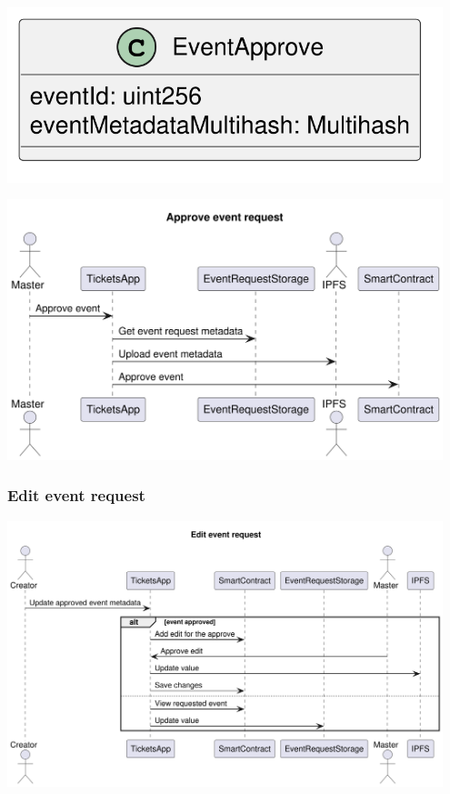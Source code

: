 \documentclass[11pt]{article}
\begin{document}
\begin{center}
\includegraphics[width=0.95\textwidth]{./img/event-approve.png}
\label{org6d06529}
\end{center}

\begin{center}
\includegraphics[width=0.95\textwidth]{./img/approve-event-request.png}
\label{org67cfabb}
\end{center}
\subsubsection{Edit event request}
\label{sec:orgd42e58c}

\begin{center}
\includegraphics[width=0.95\textwidth]{./img/edit-event-request.png}
\label{org3f988f8}
\end{center}
\end{document}
